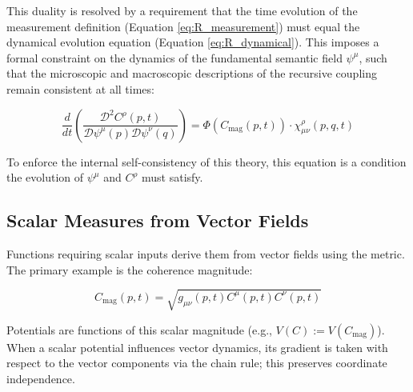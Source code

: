 This duality is resolved by a requirement that the time evolution of the measurement definition (Equation \ref{eq:R_measurement}) must equal the dynamical evolution equation (Equation \ref{eq:R_dynamical}). This imposes a formal constraint on the dynamics of the fundamental semantic field \(\psi^\mu\), such that the microscopic and macroscopic descriptions of the recursive coupling remain consistent at all times:

\begin{equation}
\label{eq:R_consistency}
\frac{d}{dt} \left( \frac{\mathcal{D}^2 C^\rho(p,t)}{\mathcal{D} \psi^\mu(p) \mathcal{D} \psi^\nu(q)} \right) = \Phi(C_{\mathrm{mag}}(p,t)) \cdot \chi^\rho_{\mu\nu}(p,q,t)
\end{equation}

To enforce the internal self-consistency of this theory, this equation is a condition the evolution of \(\psi^\mu\) and \(C^\rho\) must satisfy.


\subsection{Scalar Measures from Vector Fields}
\label{2.4.8:scalar_measures_from_vector_fields}

Functions requiring scalar inputs derive them from vector fields using the metric. The primary example is the coherence magnitude:

\begin{equation}
C_{\mathrm{mag}}(p,t) = \sqrt{g_{\mu\nu}(p,t) C^\mu(p,t) C^\nu(p,t)}
\end{equation}

Potentials are functions of this scalar magnitude (e.g., \(V(C) := V(C_{\mathrm{mag}})\)). When a scalar potential influences vector dynamics, its gradient is taken with respect to the vector components via the chain rule; this preserves coordinate independence. 